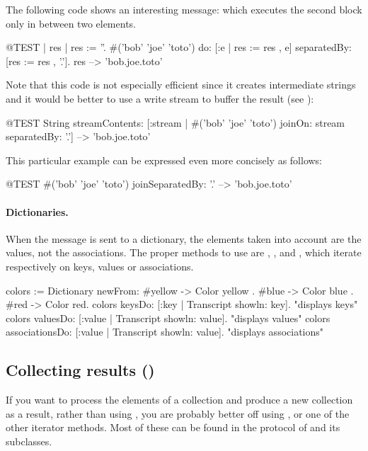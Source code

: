 \documentclass[a4paper,10pt,twoside]{book}
\begin{document}
The following code shows an interesting message:  which
executes the second block only in between two elements.
\begin{code}{@TEST | res | }
res := ''.
#('bob' 'joe' 'toto') do: [:e | res := res , e] separatedBy: [res := res , '.'].
res --> 'bob.joe.toto'
\end{code}
\noindent
Note that this code is not especially efficient since it creates intermediate strings and it would be better to use a write stream to buffer the result (see ):
\begin{code}{@TEST}
String streamContents: [:stream | #('bob' 'joe' 'toto') joinOn: stream separatedBy: '.'] --> 'bob.joe.toto'
\end{code}
\noindent
This particular example can be expressed even more concisely as follows:
\begin{code}{@TEST}
#('bob' 'joe' 'toto') joinSeparatedBy: '.' --> 'bob.joe.toto'
\end{code}


\paragraph{Dictionaries.}
When the message  is sent to a dictionary, the elements taken into account are the values, not the associations. The proper methods to use are , , and , which iterate respectively on keys, values or associations.

\begin{code}{}
colors := Dictionary newFrom: {#yellow -> Color yellow . #blue -> Color blue . #red -> Color red}.
colors keysDo: [:key | Transcript showln: key].                    "displays keys"
colors valuesDo: [:value | Transcript showln: value].            "displays values"
colors associationsDo: [:value | Transcript showln: value].  "displays associations"
\end{code}

\subsection{Collecting results ()}
If you want to process the elements of a collection and produce a new collection as a result, rather than using , you are probably better off using , or one of the other iterator methods.
Most of these can be found in the  protocol of  and its subclasses.
\end{document}
